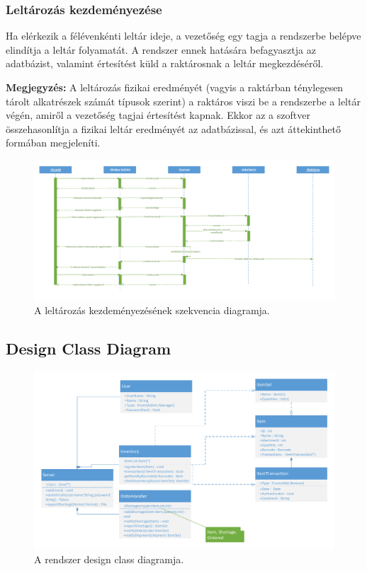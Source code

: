 \documentclass[12pt]{article}\usepackage[left=20mm,right=20mm,top=20mm,bottom=20mm]{geometry}
\begin{document}
\thispagestyle{empty}
\begin{landscape}
\subsubsection{Leltározás kezdeményezése}
Ha elérkezik a félévenkénti leltár ideje, a vezetőség egy tagja a rendszerbe belépve elindítja a leltár folyamatát. 
A rendszer ennek hatására befagyasztja az adatbázist, valamint értesítést küld a raktárosnak a leltár megkezdéséről. 

\noindent\textbf{Megjegyzés:} A leltározás fizikai eredményét (vagyis a raktárban ténylegesen tárolt alkatrészek számát típusok szerint) a raktáros viszi be a rendszerbe a leltár végén, amiről a vezetőség tagjai értesítést kapnak. 
Ekkor az a szoftver összehasonlítja a fizikai leltár eredményét az adatbázissal, és azt áttekinthető formában megjeleníti. 

\begin{figure}[!h]
    \centering
        \includegraphics[width=1.4\textwidth]{kepek/leltar_szekvencia.pdf}
        \caption{A leltározás kezdeményezésének szekvencia diagramja.}
\end{figure}
\end{landscape}

\thispagestyle{empty}
\begin{landscape}
\subsection{Design Class Diagram}
\begin{figure}[!h]
    \centering
        \includegraphics[width=1.4\textwidth]{kepek/dcd.pdf}
        \caption{A rendszer design class diagramja.}
\end{figure}
\end{landscape}
\end{document}
